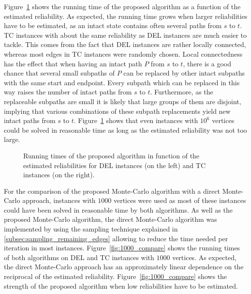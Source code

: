 \documentclass{article}
\begin{document}
Figure~\ref{fig:relrun} shows the running time
of the proposed algorithm as a function of the estimated reliability. As
expected, the running time grows when larger reliabilities have to be estimated,
as an intact state contains often several paths from $s$ to $t$. TC instances
with about the same reliability as DEL instances are much easier to tackle.
This comes from the fact that DEL instances are rather locally connected,
whereas most edges in TC instances were randomly chosen. Local connectedness
has the effect that when having an intact path $P$ from $s$ to $t$, there is
a good chance that several small subpaths of $P$ can be replaced by other intact
subpaths with the same start and endpoint. Every subpath which can be replaced
in this way raises the number of intact paths from $s$ to $t$. Furthermore, as
the replaceable subpaths are small it is likely that large groups of them are
disjoint, implying that various combinations of these subpath replacements
yield new intact paths from $s$ to $t$.
Figure~\ref{fig:relrun} shows that
even instances with $10^6$ vertices could be solved in reasonable time
as long as the estimated reliability was not too large.

\begin{figure}[h!]
\begin{center}
\caption{\label{fig:relrun} Running times of the proposed algorithm in
  function of the estimated reliabilities for DEL instances (on
  the left) and TC instances (on the right).}
\end{center}
\end{figure}

For the comparison of the proposed \mbox{Monte-Carlo} algorithm with
a direct \mbox{Monte-Carlo} approach, instances with $1000$ vertices
were used as most of these instances could have been solved in
reasonable time by both algorithms. As well as the proposed
\mbox{Monte-Carlo} algorithm, the direct \mbox{Monte-Carlo}
algorithm was implemented by using the sampling technique explained
in \ref{subsec:sampling_remaining_edges} allowing to reduce the
time needed per iteration in most instances.
Figure~\ref{fig:1000_compare} shows
the running times of both algorithms on DEL and TC instances with $1000$
vertices. As expected, the direct \mbox{Monte-Carlo} approach has an
approximately linear dependence on the reciprocal of the
estimated reliability.
Figure~\ref{fig:1000_compare} shows
the strength of the proposed algorithm when low reliabilities
have to be estimated.
\end{document}
